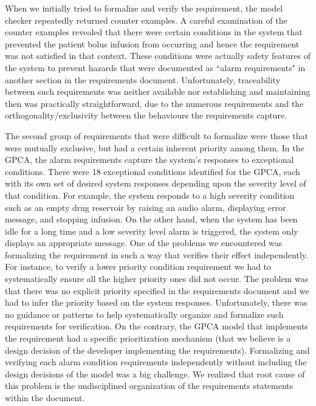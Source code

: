 When we initially tried to formalize and verify the requirement, the model checker repeatedly returned counter examples. A careful examination of the counter examples revealed that there were certain conditions in the system that prevented the patient bolus infusion from occurring and hence the requirement was not satisfied in that context. These conditions were actually safety features of the system to prevent hazards that were documented as ``alarm requirements" in another section in the requirements document.  Unfortunately, traceability between such requirements was neither available nor establishing and maintaining then was practically straightforward, due to the numerous requirements and the orthogonality/exclusivity between the behaviours the requirements capture.

The second group of requirements that were difficult to formalize were those that were mutually exclusive, but had a certain inherent priority among them. In the GPCA, the alarm requirements capture the system's responses to exceptional conditions. There were 18 exceptional conditions identified for the GPCA, each with its own set of desired system responses depending upon the severity level of that condition. For example, the system responds to a high severity condition such as an empty drug reservoir by raising an audio alarm, displaying error message, and stopping infusion. On the other hand, when the system has been idle for a long time and a low severity level alarm is triggered, the system only displays an appropriate message. One of the problems we encountered was formalizing the requirement in such a way that verifies their effect independently. For instance, to verify a lower priority condition requirement we had to systematically ensure all the higher priority ones did not occur. The problem was that there was no explicit priority specified in the requirements document and we had to infer the priority based on the system responses. Unfortunately, there was no guidance or patterns to help systematically organize and formalize such requirements for verification. On the contrary, the GPCA model that implements the requirement had a specific prioritization mechanism (that we believe is a design decision of the developer implementing the requirements). Formalizing and verifying each alarm condition requirements independently without including the design decisions of the model was a big challenge. We realized that root cause of this problem is the undisciplined organization of the requirements statements within the document.

